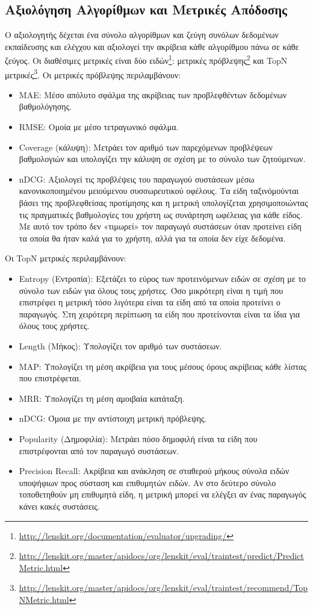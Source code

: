 \subsection{Aξιολόγηση Αλγορίθμων και Mετρικές Απόδοσης}
Ο αξιολογητής δέχεται ένα σύνολο αλγορίθμων και ζεύγη συνόλων δεδομένων εκπαίδευσης και ελέγχου και αξιολογεί την ακρίβεια κάθε αλγορίθμου πάνω σε κάθε ζεύγος. Οι διαθέσιμες μετρικές είναι δύο ειδών\footnote{\en \url{http://lenskit.org/documentation/evaluator/upgrading/}}: μετρικές πρόβλεψης\footnote{\en \url{http://lenskit.org/master/apidocs/org/lenskit/eval/traintest/predict/PredictMetric.html}} και {\en TopN} μετρικές\footnote{\en \url{http://lenskit.org/master/apidocs/org/lenskit/eval/traintest/recommend/TopNMetric.html}}. Οι μετρικές πρόβλεψης περιλαμβάνουν: 
\begin{itemize}
\item {\en MAE}: Μέσο απόλυτο σφάλμα της ακρίβειας των προβλεφθέντων δεδομένων βαθμολόγησης. 
\item {\en RMSE}: Ομοία με μέσο τετραγωνικό σφάλμα. 
\item {\en Coverage \el(κάλυψη)}: Μετράει τον αριθμό των παρεχόμενων προβλέψεων βαθμολογιών και υπολογίζει την κάλυψη σε σχέση με το σύνολο των ζητούμενων.
\item {\en nDCG}: Αξιολογεί τις προβλέψεις του παραγωγού συστάσεων μέσω κανονικοποιημένου μειούμενου συσσωρευτικού οφέλους. Τα είδη ταξινόμούνται βάσει της προβλεφθείσας προτίμησης και η μετρική υπολογίζεται χρησιμοποιώντας τις πραγματικές βαθμολογίες του χρήστη ως συνάρτηση ωφέλειας για κάθε είδος. Με αυτό τον τρόπο δεν «τιμωρεί» τον παραγωγό συστάσεων όταν προτείνει είδη τα οποία θα ήταν καλά για το χρήστη, αλλά για τα οποία δεν είχε δεδομένα.
\end{itemize}
Οι {\en TopN} μετρικές περιλαμβάνουν:
\begin{itemize}
 \item {\en Entropy} (Εντροπία): Εξετάζει το εύρος των προτεινόμενων ειδών σε σχέση με το σύνολο των ειδών για όλους τους χρήστες. Όσο μικρότερη είναι η τιμή που επιστρέφει η μετρική τόσο λιγότερα είναι τα είδη από τα οποία προτείνει ο παραγωγός. Στη χειρότερη περίπτωση τα είδη που προτείνονται είναι τα ίδια για όλους τους χρήστες.
 \item {\en Length} (Μήκος): Υπολογίζει τον αριθμό των συστάσεων. 
 \item {\en MAP}: Υπολογίζει τη μέση ακρίβεια για τους μέσους όρους ακρίβειας κάθε λίστας που επιστρέφεται.
 \item {\en MRR}: Υπολογίζει τη μέση αμοιβαία κατάταξη. 
 \item {\en nDCG}: Όμοια με την αντίστοιχη μετρική πρόβλεψης.
 \item {\en Popularity \el(Δημοφιλία)}: Μετράει πόσο δημοφιλή είναι τα είδη που επιστρέφονται από τον παραγωγό συστάσεων.
 \item {\en Precision Recall:} \el Ακρίβεια και ανάκληση σε σταθερού μήκους σύνολα ειδών υποψήφιων προς σύσταση και επιθυμητών ειδών. Αν στο δεύτερο σύνολο τοποθετηθούν μη επιθυμητά είδη, η μετρική μπορεί να ελέγξει αν ένας παραγωγός κάνει κακές συστάσεις. 
\end{itemize}
